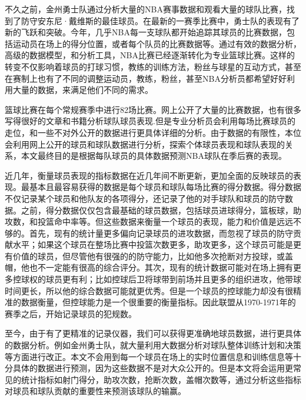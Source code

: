不久之前，金州勇士队通过分析大量的NBA赛事数据和观看大量的球队比赛，找到了防守安东尼·戴维斯的最佳球员。在最新的一赛季比赛中，勇士队的表现有了新的飞跃和突破。今年，几乎NBA每一支球队都开始追踪其球员的比赛数据，包括运动员在场上的得分位置，或者每个队员的比赛数据等。通过有效的数据分析，高级的数据模型，和分析工具，NBA比赛已经逐渐转化为专业篮球比赛。这样的转变不仅影响着球员的打球习惯，教练的训练方法，粉丝与球星的互动方式，甚至在赛制上也有了不同的调整运动员，教练，粉丝，甚至NBA分析员都希望好好利用大量的数据，来满足他们不同的需求。



篮球比赛在每个常规赛季中进行82场比赛。网上公开了大量的比赛数据，也有很多写得很好的文章和书籍分析球队球员表现.但是专业分析员会利用每场比赛球员的走位，和一些不对外公开的数据进行更具体详细的分析。由于数据的有限性，本位会利用网上公开的球员和球队数据进行分析，探索个体球员表现和球队表现的关系，本文最终目的是根据每队球员的具体数据预测NBA球队在季后赛的表现。


近几年，衡量球员表现的指标数据在近几年间不断更新，更加全面的反映球员的表现。最基本且最容易获得的数据是每个球员和球队每场比赛的得分数据。得分数据不仅记录某个球员和他队友的各项得分，还记录了他的对手球队和球员的防守数据。之前，得分数据仅仅包含最基础的球员数据，包括球员进球得分，篮板球，助攻数，和投篮命中率等。但这些数据来衡量一个球员的表现，能力和价值是远远不够的。首先，现有的统计量更多偏向记录球员的进攻数据，而忽视了球员的防守贡献水平；如果这个球员在整场比赛中投篮次数更多，助攻更多，这个球员可能是更有价值的球员，但尽管他有很强的的防守能力，比如他多次抢断对方投球，或盖帽，他也不一定能有很高的综合评分。其次，现有的统计数据可能对在场上拥有更多控球权的球员更有利；比如控球后卫将球带到前场并且更多的组织进攻，他带球时间更长，所以他的综合数据可能就更优秀。但是一个球员的控球能力却没有很精准的数据衡量，但控球能力是一个很重要的衡量指标。因此联盟从1970-1971年的赛季之后，开始记录球员的犯规数。


至今，由于有了更精准的记录仪器，我们可以获得更准确地球员数据，进行更具体的数据分析。例如金州勇士队，就大量利用大数据分析对球队整体训练计划和决策等方面进行改正。本文不会用到每一个球员在场上的实时位置信息和训练信息等十分具体的数据进行预测，因为这些数据不是对大众公开的。但是本文将会运用更常见的统计指标如射门得分，助攻次数，抢断次数，盖帽次数等，通过分析这些指标对球员和球队贡献的重要性来预测该球队的输赢。